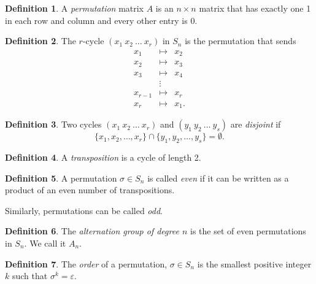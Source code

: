 \documentclass[12pt]{article}
\theoremstyle{definition}
\newtheorem*{defn}{Definition}
\begin{document}
\begin{defn}
A \emph{permutation} matrix $A$ is an $n\times n$ matrix that has exactly one 1 in each row and column and every other entry is 0.
\end{defn}
\begin{defn}
The $r$-cycle $(x_1\ x_2\ \dots\ x_r)$ in $S_n$ is the permutation that sends
$$\begin{matrix}
x_1&\mapsto&x_2\\
x_2&\mapsto&x_3\\
x_3&\mapsto&x_4\\
&\vdots\\
x_{r-1}&\mapsto&x_r\\
x_r&\mapsto&x_1.
\end{matrix}$$
\end{defn}
\begin{defn}
Two cycles $(x_1\ x_2\ \dots\ x_r)$ and $(y_1\ y_2\ \dots\ y_s)$ are \emph{disjoint} if 	
\[\{x_1,x_2,\dots,x_r\}\cap\{y_1,y_2,\dots,y_s\}=\emptyset.\]
\end{defn}
\begin{defn}
A \emph{transposition} is a cycle of length 2.
\end{defn}
\begin{defn}
A permutation $\sigma\in S_n$ is called \emph{even} if it can be written as a product of an even number of transpositions.

Similarly, permutations can be called \emph{odd}.
\end{defn}
\begin{defn}
The \emph{alternation group of degree $n$} is the set of even permutations in $S_n$.  We call it $A_n$.
\end{defn}
\begin{defn}
The \emph{order} of a permutation, $\sigma\in S_n$ is the smallest positive integer $k$ such that $\sigma^k=\varepsilon$.
\end{defn}
\end{document}
